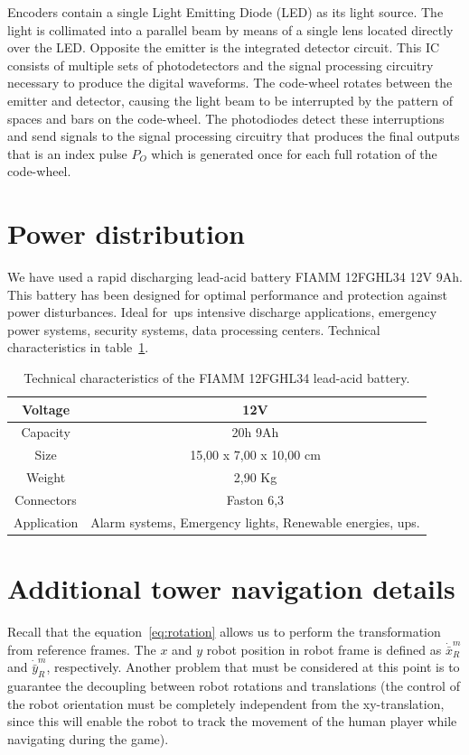 Encoders contain a single Light Emitting Diode (LED) as its light source. The light is collimated into a parallel beam by means of a single lens located directly over the LED. Opposite the emitter is the integrated detector circuit. This IC consists of multiple sets of photodetectors and the signal processing circuitry necessary to produce the digital waveforms. The code-wheel rotates between the emitter and detector, causing the light beam to be interrupted by the pattern of spaces and bars on the code-wheel. The photodiodes detect these interruptions and send signals to the signal processing circuitry that produces the final outputs that is an index pulse $P_O$ which is generated once for each full rotation of the code-wheel.

\section{Power distribution}
We have used a rapid discharging lead-acid battery FIAMM 12FGHL34 12V 9Ah. This battery has been designed for optimal performance and protection against power disturbances. Ideal for~\gls{ups} intensive discharge applications, emergency power systems, security systems, data processing centers. Technical characteristics in table~\ref{tab:power_techicals}.

\begin{table}[h]
	\begin{center}
		\begin{tabular}{|c|c|}
		\hline
        Voltage & 12V \\
        \hline 
        Capacity & 20h 9Ah \\
        \hline 
        Size & 15,00 x 7,00 x 10,00 cm \\
        \hline 
        Weight & 2,90 Kg \\
        \hline 
        Connectors & Faston 6,3 \\
        \hline 
        Application & Alarm systems, Emergency lights, Renewable energies, \gls{ups}.\\
        \hline 
    \end{tabular}
    \caption{Technical characteristics of the FIAMM 12FGHL34 lead-acid battery.}
    \label{tab:power_techicals}
    \end{center}
\end{table}

\section{Additional tower navigation details}
Recall that the equation~\ref{eq:rotation} allows us to perform the transformation from reference frames. The $x$ and $y$ robot position in robot frame is defined as $\dot{\bar{x}}_R^m$ and $\dot{\bar{y}}_R^m$, respectively. Another problem that must be considered at this point is to guarantee the decoupling between robot rotations and translations (the control of the robot orientation must be completely independent from the xy-translation, since this will enable the robot to track the movement of the human player while navigating during the game). 

